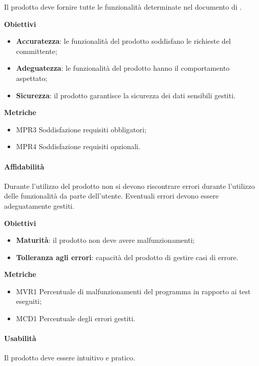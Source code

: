 Il prodotto deve fornire tutte le funzionalità determinate nel documento di \AdR{}.

\textbf{Obiettivi}
\begin{itemize}
\item \textbf{Accuratezza}: le funzionalità del prodotto soddisfano le richieste del committente;
\item \textbf{Adeguatezza}: le funzionalità del prodotto hanno il comportamento aspettato;
\item \textbf{Sicurezza}: il prodotto garantisce la sicurezza dei dati sensibili gestiti.
\end{itemize}

\textbf{Metriche}
\begin{itemize}
\item MPR3 Soddisfazione requisiti obbligatori;
\item MPR4 Soddisfazione requisiti opzionali.
\end{itemize}

\paragraph{Affidabilità}

Durante l'utilizzo del prodotto non si devono riscontrare errori durante l'utilizzo delle funzionalità da parte dell'utente. Eventuali errori devono essere adeguatamente gestiti.

\textbf{Obiettivi}
\begin{itemize}
\item \textbf{Maturità}: il prodotto non deve avere malfunzionamenti;
\item \textbf{Tolleranza agli errori}: capacità del prodotto di gestire casi di errore.
\end{itemize}

\textbf{Metriche}
\begin{itemize}
\item MVR1 Percentuale di malfunzionamenti del programma in rapporto ai test eseguiti;
\item MCD1 Percentuale degli errori gestiti.
\end{itemize}

\paragraph{Usabilità}

Il prodotto deve essere intuitivo e pratico.

